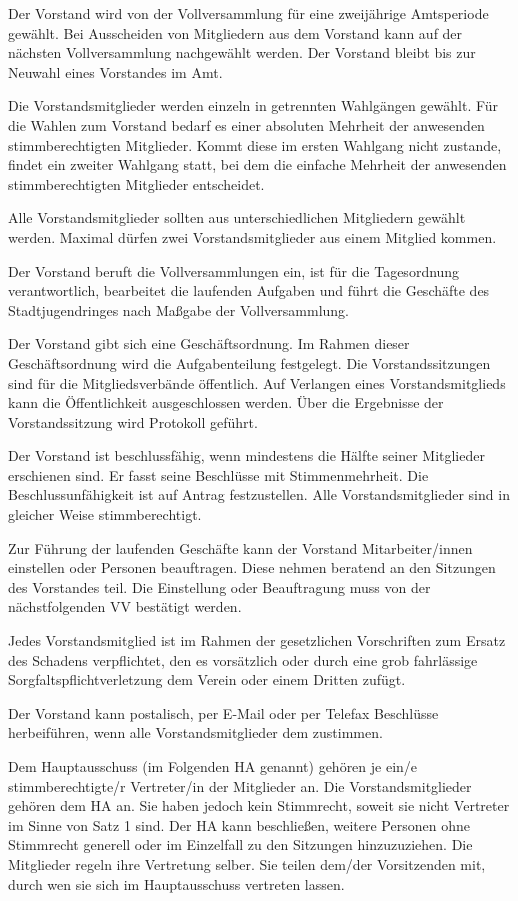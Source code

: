 \documentclass[10pt,a4paper,oneside,parskip=half]{scrartcl}
\begin{document}
\begin{contract}
Der Vorstand wird von der Vollversammlung für eine zweijährige Amtsperiode gewählt. Bei Ausscheiden von Mitgliedern aus dem Vorstand kann auf der nächsten Vollversammlung nachgewählt werden. Der Vorstand bleibt bis zur Neuwahl eines Vorstandes im Amt.

Die Vorstandsmitglieder werden einzeln in getrennten Wahlgängen gewählt. Für die Wahlen zum Vorstand bedarf es einer absoluten Mehrheit der anwesenden stimmberechtigten Mitglieder. Kommt diese im ersten Wahlgang nicht zustande, findet ein zweiter Wahlgang statt, bei dem die einfache Mehrheit der anwesenden stimmberechtigten Mitglieder entscheidet.

Alle Vorstandsmitglieder sollten aus unterschiedlichen Mitgliedern gewählt werden. Maximal dürfen zwei Vorstandsmitglieder aus einem Mitglied kommen.

Der Vorstand beruft die Vollversammlungen ein, ist für die Tagesordnung verantwortlich, bearbeitet die laufenden Aufgaben und führt die Geschäfte des Stadtjugendringes nach Maßgabe der Vollversammlung.

Der Vorstand gibt sich eine Geschäftsordnung. Im Rahmen dieser Geschäftsordnung wird die Aufgabenteilung festgelegt. Die Vorstandssitzungen sind für die Mitgliedsverbände öffentlich. Auf Verlangen eines Vorstandsmitglieds kann die Öffentlichkeit ausgeschlossen werden. Über die Ergebnisse der Vorstandssitzung wird Protokoll geführt.

Der Vorstand ist beschlussfähig, wenn mindestens die Hälfte seiner Mitglieder erschienen sind. Er fasst seine Beschlüsse mit Stimmenmehrheit. Die Beschlussunfähigkeit ist auf Antrag festzustellen. Alle Vorstandsmitglieder sind in gleicher Weise stimmberechtigt.

Zur Führung der laufenden Geschäfte kann der Vorstand Mitarbeiter/innen einstellen oder Personen beauftragen. Diese nehmen beratend an den Sitzungen des Vorstandes teil. Die Einstellung oder Beauftragung muss von der nächstfolgenden VV bestätigt werden.

Jedes Vorstandsmitglied ist im Rahmen der gesetzlichen Vorschriften zum Ersatz des Schadens verpflichtet, den es vorsätzlich oder durch eine grob fahrlässige Sorgfaltspflichtverletzung dem Verein oder einem Dritten zufügt.

Der Vorstand kann postalisch, per E-Mail oder per Telefax Beschlüsse herbeiführen, wenn alle Vorstandsmitglieder dem zustimmen.

Dem Hauptausschuss (im Folgenden HA genannt) gehören je ein/e stimmberechtigte/r Vertreter/in der Mitglieder an. Die Vorstandsmitglieder gehören dem HA an. Sie haben jedoch kein Stimmrecht, soweit sie nicht Vertreter im Sinne von Satz 1 sind. Der HA kann beschließen, weitere Personen ohne Stimmrecht generell oder im Einzelfall zu den Sitzungen hinzuzuziehen. Die Mitglieder regeln ihre Vertretung selber. Sie teilen dem/der Vorsitzenden mit, durch wen sie sich im Hauptausschuss vertreten lassen.


\end{contract}
\end{document}
